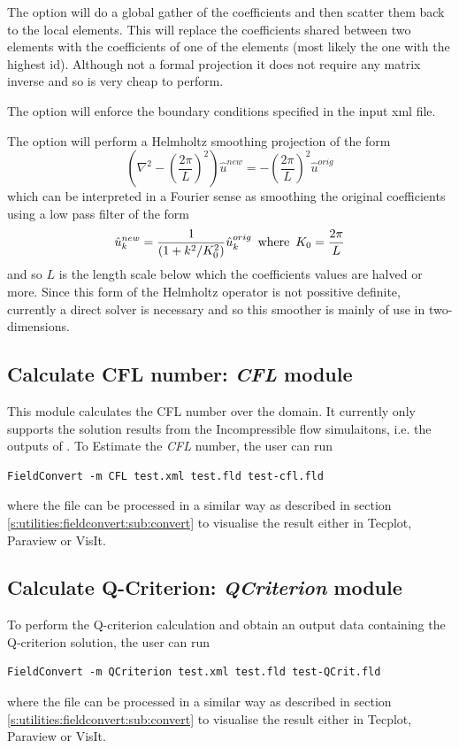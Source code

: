 The option  will do a global gather of the
coefficients and then scatter them back to the local elements. This
will replace the coefficients shared between two elements with the
coefficients of one of the elements (most likely the one with the
highest id). Although not a formal projection it does not require any
matrix inverse and so is very cheap to perform.

The option  will enforce the boundary conditions
specified in the input xml file.

The option  will perform a Helmholtz
smoothing projection of the form
\[
\left (\nabla^2 - \left (\frac{2 \pi}{L}\right )^2 \right ) \hat{u}^{new} =
-\left (\frac{2 \pi}{L}\right )^2 \hat{u}^{orig}
\]
which can be interpreted in a Fourier sense as smoothing the original
coefficients using a low pass filter of the form
\[
\hat{u}_k^{new} = \frac{1}{(1 + k^2/K_0^2)} \hat{u}_k^{orig} \mbox{\,  where  \,}
K_0 = \frac{2 \pi}{L}
\]
and so $L$ is the length scale below which the coefficients values are
halved or more. Since this form of the Helmholtz operator is not
possitive definite, currently a direct solver is necessary and so this
smoother is mainly of use in two-dimensions.
%
%
%
\subsection{Calculate CFL number: \textit{CFL} module}
This module calculates the CFL number over the domain. It currently only
supports the solution results from the Incompressible flow simulaitons, i.e.
the outputs of . To Estimate the \textit{CFL} 
number, the user can run
%
\begin{lstlisting}[style=BashInputStyle]
FieldConvert -m CFL test.xml test.fld test-cfl.fld
\end{lstlisting}


where the file  can be processed in a similar
way as described in section \ref{s:utilities:fieldconvert:sub:convert}
to visualise the result either in Tecplot, Paraview or VisIt.
%
%
%
\subsection{Calculate Q-Criterion: \textit{QCriterion} module}
To perform the Q-criterion calculation and obtain an output
data containing the Q-criterion solution, the user can run
%
\begin{lstlisting}[style=BashInputStyle]
FieldConvert -m QCriterion test.xml test.fld test-QCrit.fld
\end{lstlisting}
%
where the file  can be processed in a similar
way as described in section \ref{s:utilities:fieldconvert:sub:convert}
to visualise the result either in Tecplot, Paraview or VisIt.
%
%
%
